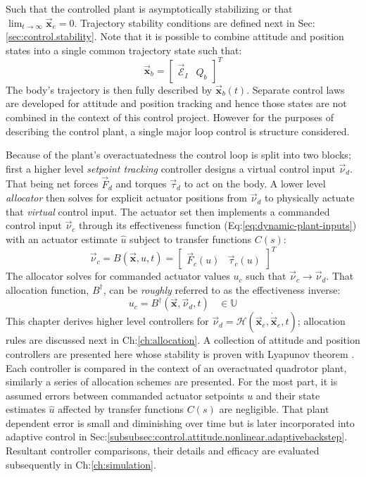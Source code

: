 Such that the controlled plant is asymptotically stabilizing or that $\lim_{t\rightarrow\infty}\vec{\mathbf{x}}_e=0$. Trajectory stability conditions are defined next in Sec:\ref{sec:control.stability}. Note that it is possible to combine attitude and position states into a single common trajectory state such that:
\\
\vspace{-5pt}
\begin{equation}
\vec{\mathbf{x}}_b=\begin{bmatrix}\vec{\mathcal{E}}_I&Q_b\end{bmatrix}^T
\end{equation}
The body's trajectory is then fully described by $\vec{\mathbf{x}}_b(t)$. Separate control laws are developed for attitude and position tracking and hence those states are not combined in the context of this control project. However for the purposes of describing the control plant, a single major loop control is structure considered.
\par
Because of the plant's overactuatedness the control loop is split into two blocks; first a higher level \emph{setpoint tracking} controller designs a virtual control input $\vec{\nu}_d$. That being net forces $\vec{F}_d$ and torques $\vec{\tau}_d$ to act on the body. A lower level \emph{allocator} then solves for explicit actuator positions from $\vec{\nu}_d$ to physically actuate that \emph{virtual} control input. The actuator set then implements a commanded control input $\vec{\nu}_c$ through its effectiveness function (Eq:\ref{eq:dynamic-plant-inputs}) with an actuator estimate $\hat{u}$ subject to transfer functions $C(s)$:
\begin{equation}\label{eq:control-effectiveness}
\vec{\nu}_c=B(\vec{\mathbf{x}},\hat{u},t)=\begin{bmatrix}
\vec{F}_c(u) & \vec{\tau}_c(u)
\end{bmatrix}^T
\end{equation}
The allocator solves for commanded actuator values $u_c$ such that $\vec{\nu}_c\rightarrow\vec{\nu}_d$. That allocation function, $B^\dagger$, can be \emph{roughly} referred to as the effectiveness inverse:
\begin{equation}
u_c=B^{\dagger}(\vec{\mathbf{x}},\vec{\nu}_d,t)~~~~\in\mathbb{U}
\end{equation}
This chapter derives higher level controllers for $\vec{\nu}_d=\mathcal{H}(\vec{\mathbf{x}}_e,\dot{\vec{\mathbf{x}}}_e,t)$; allocation rules are discussed next in Ch:\ref{ch:allocation}. A collection of attitude and position controllers are presented here whose stability is proven with Lyapunov theorem \cite{bojelayupanov,lyapunovstabilitytheorem,noteonlyapunov}. Each controller is compared in the context of an overactuated quadrotor plant, similarly a series of allocation schemes are presented. For the most part, it is assumed errors between commanded actuator setpoints $u$ and their state estimates $\hat{u}$ affected by transfer functions $C(s)$ are negligible. That plant dependent error is small and diminishing over time but is later incorporated into adaptive control in Sec:\ref{subsubsec:control.attitude.nonlinear.adaptivebackstep}. Resultant controller comparisons, their details and efficacy are evaluated subsequently in Ch:\ref{ch:simulation}. 

